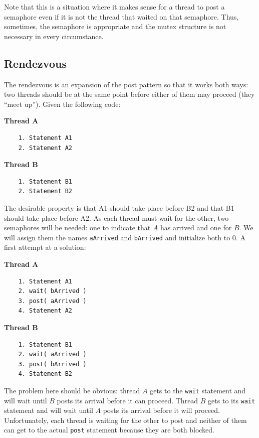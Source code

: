 Note that this is a situation where it makes sense for a thread to post a semaphore even if it is not the thread that waited on that semaphore. Thus, sometimes, the semaphore is appropriate and the mutex structure is not necessary in every circumstance.

\subsection*{Rendezvous}
The rendezvous is an expansion of the post pattern so that it works both ways: two threads should be at the same point before either of them may proceed (they ``meet up''). Given the following code:

\begin{multicols}{2}
\textbf{Thread A}\vspace{-2em}
  \begin{verbatim}
	1. Statement A1
	2. Statement A2
  \end{verbatim}
\columnbreak
\textbf{Thread B}\vspace{-2em}
  \begin{verbatim}
	1. Statement B1
	2. Statement B2
  \end{verbatim}
\end{multicols}
\vspace{-2em}

The desirable property is that A1 should take place before B2 and that B1 should take place before A2. As each thread must wait for the other, two semaphores will be needed: one to indicate that $A$ has arrived and one for $B$. We will assign them the names \texttt{aArrived} and \texttt{bArrived} and initialize both to 0. A first attempt at a solution:

\begin{multicols}{2}
\textbf{Thread A}\vspace{-2em}
  \begin{verbatim}
	1. Statement A1
	2. wait( bArrived )
	3. post( aArrived )
	4. Statement A2
  \end{verbatim}
\columnbreak
\textbf{Thread B}\vspace{-2em}
  \begin{verbatim}
	1. Statement B1
	2. wait( aArrived )
	3. post( bArrived )
	4. Statement B2
  \end{verbatim}
\end{multicols}
\vspace{-2em}


The problem here should be obvious: thread $A$ gets to the \texttt{wait} statement and will wait until $B$ posts its arrival before it can proceed. Thread $B$ gets to its \texttt{wait} statement and will wait until $A$ posts its arrival before it will proceed. Unfortunately, each thread is waiting for the other to post and neither of them can get to the actual \texttt{post} statement because they are both blocked. 

